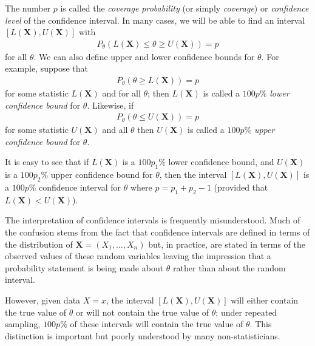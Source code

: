 The number \(p\) is called the \emph{coverage probability} (or simply \emph{coverage}) 
or \emph{confidence level} of the confidence interval. 
In many cases, 
we will be able to find an interval \(\left[L(\boldsymbol{X}), U(\boldsymbol{X})\right]\) with 
\begin{align}
P_{\theta}\left(L(\boldsymbol{X}) \leq \theta \geq U(\boldsymbol{X})\right) = p
\end{align}
for all \(\theta\). 
We can also define upper and lower confidence bounds for \(\theta\). 
For example, 
suppose that
\begin{align}
P_{\theta} \left(\theta \geq L(\boldsymbol{X})\right) = p
\end{align}
for some statistic \(L(\boldsymbol{X})\) and for all \(\theta\); 
then \(L(\boldsymbol{X})\) is called a \(100p\%\) \emph{lower confidence bound} for \(\theta\). 
Likewise, if
\begin{align}
P_{\theta} \left( \theta \leq U(\boldsymbol{X}) \right) = p
\end{align}
for some statistic \(U(\boldsymbol{X})\) and all \(\theta\) 
then \(U(\boldsymbol{X})\) is called a \(100p\%\) \emph{upper confidence bound} for \(\theta\). 

It is easy to see that if \(L(\boldsymbol{X})\) is a \(100p_{1}\%\) lower confidence bound, 
and \(U(\boldsymbol{X})\) is a \(100p_{2}\%\) upper confidence bound for \(\theta\), 
then the interval \(\left[L(\boldsymbol{X}), U(\boldsymbol{X})\right]\) 
is a \(100p\%\) confidence interval for \(\theta\) where \(p = p_{1} + p_{2} - 1\) 
(provided that \(L(\boldsymbol{X}) < U(\boldsymbol{X})\)).

The interpretation of confidence intervals is frequently misunderstood. 
Much of the confusion stems from the fact that confidence intervals are defined in terms of 
the distribution of \(\boldsymbol{X}=\left(X_{1}, \ldots, X_{n}\right)\) but, 
in practice, 
are stated in terms of the observed values of these random variables 
leaving the impression that a probability statement is being made about \(\theta\) rather than about the random interval.

However, 
given data \(X = x\), 
the interval \(\left[L(\boldsymbol{X}), U(\boldsymbol{X})\right]\) will either
contain the true value of \(\theta\) or will not contain the true value of \(\theta\); 
under repeated sampling, 
\(100p\%\) of these intervals will contain the true value of \(\theta\). 
This distinction is important but poorly understood by many non-statisticians.

